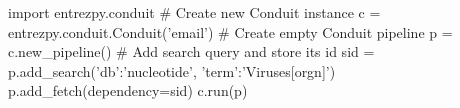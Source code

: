 \begin{python}[basicstyle=\footnotesize\ttfamily]
  import entrezpy.conduit
  # Create new Conduit instance
  c = entrezpy.conduit.Conduit('email')
  # Create empty Conduit pipeline
  p = c.new_pipeline()
  # Add search query and store its id
  sid = p.add_search({'db':'nucleotide', 'term':'Viruses[orgn]'})
  p.add_fetch(dependency=sid)
  c.run(p)
\end{python}
